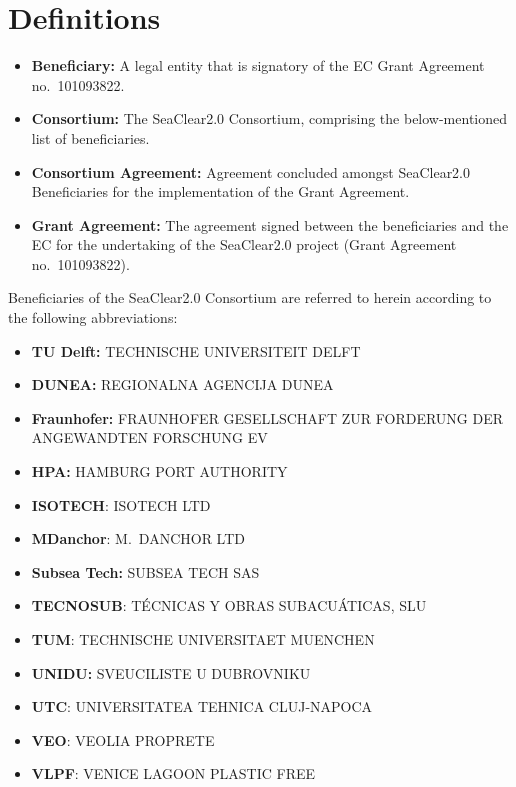 \documentclass[a4paper,11pt]{article}
\let\oldsection\section
\renewcommand\section{\clearpage\oldsection}
\begin{document}
\tableofcontents

\section*{Definitions}

\begin{itemize}
\setlength\itemsep{0em}
\item \textbf{Beneficiary:} A legal entity that is signatory of the EC Grant Agreement no.~101093822.
\item \textbf{Consortium:} The SeaClear2.0 Consortium, comprising the below-mentioned list of beneficiaries.
\item \textbf{Consortium Agreement:} Agreement concluded amongst SeaClear2.0 Beneficiaries for the implementation of the Grant Agreement.
\item \textbf{Grant Agreement:} The agreement signed between the beneficiaries and the EC for the undertaking of the SeaClear2.0 project (Grant Agreement no.~101093822).
\end{itemize}

Beneficiaries of the SeaClear2.0 Consortium are referred to herein according to the following abbreviations:
\begin{itemize}
\setlength\itemsep{0em}
\item \textbf{TU Delft:} TECHNISCHE UNIVERSITEIT DELFT
\item \textbf{DUNEA:} REGIONALNA AGENCIJA DUNEA
\item \textbf{Fraunhofer:} FRAUNHOFER GESELLSCHAFT ZUR FORDERUNG DER ANGEWANDTEN FORSCHUNG EV
\item \textbf{HPA:} HAMBURG PORT AUTHORITY
\item \textbf{ISOTECH}: ISOTECH LTD
\item \textbf{MDanchor}: M.\ DANCHOR LTD
\item \textbf{Subsea Tech:} SUBSEA TECH SAS
\item \textbf{TECNOSUB}: T\'{E}CNICAS Y OBRAS SUBACU\'{A}TICAS, SLU
\item \textbf{TUM}: TECHNISCHE UNIVERSITAET MUENCHEN
\item \textbf{UNIDU:} SVEUCILISTE U DUBROVNIKU
\item \textbf{UTC}: UNIVERSITATEA TEHNICA CLUJ-NAPOCA
\item \textbf{VEO}: VEOLIA PROPRETE
\item \textbf{VLPF}: VENICE LAGOON PLASTIC FREE
\end{itemize}
\end{document}
